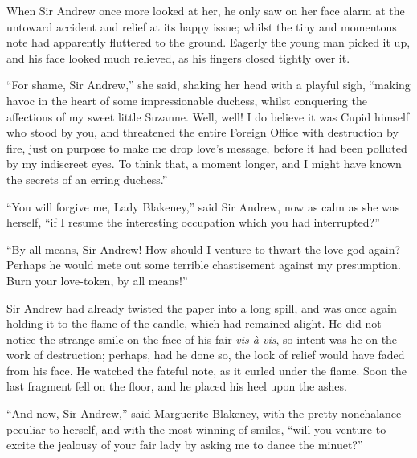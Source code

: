 When Sir Andrew once more looked at her, he only saw on her face alarm at the untoward accident and relief at its happy issue; whilst the tiny and momentous note had apparently fluttered to the ground. Eagerly the young man picked it up, and his face looked much relieved, as his fingers closed tightly over it.

\enquote{For shame, Sir Andrew,} she said, shaking her head with a playful sigh, \enquote{making havoc in the heart of some impressionable duchess, whilst conquering the affections of my sweet little Suzanne. Well, well! I do believe it was Cupid himself who stood by you, and threatened the entire Foreign Office with destruction by fire, just on purpose to make me drop love's message, before it had been polluted by my indiscreet eyes. To think that, a moment longer, and I might have known the secrets of an erring duchess.}

\enquote{You will forgive me, Lady Blakeney,} said Sir Andrew, now as calm as she was herself, \enquote{if I resume the interesting occupation which you had interrupted?}

\enquote{By all means, Sir Andrew! How should I venture to thwart the love-god again? Perhaps he would mete out some terrible chastisement against my presumption. Burn your love-token, by all means!}

Sir Andrew had already twisted the paper into a long spill, and was once again holding it to the flame of the candle, which had remained alight. He did not notice the strange smile on the face of his fair \textit{vis-à-vis}, so intent was he on the work of destruction; perhaps, had he done so, the look of relief would have faded from his face. He watched the fateful note, as it curled under the flame. Soon the last fragment fell on the floor, and he placed his heel upon the ashes.

\enquote{And now, Sir Andrew,} said Marguerite Blakeney, with the pretty nonchalance peculiar to herself, and with the most winning of smiles, \enquote{will you venture to excite the jealousy of your fair lady by asking me to dance the minuet?}